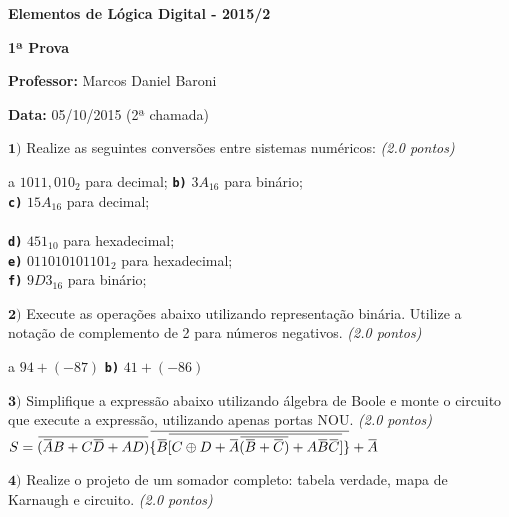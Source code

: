 \documentclass[12pt]{article}
\newcommand{\exerc}[3]{ \vspace*{25pt} {$\mathbf{#1)}$} #2 \hfill {\it #3} }
\newcommand{\exitem}[2]{ \texttt{\bf #1)} #2 \\ }
\newcommand*\xor{\mathbin{\oplus}}
\renewcommand{\neg}[1]{ 
  \mkern 1.5mu\overline{\mkern-1.5mu#1\mkern-1.5mu}\mkern 1.5mu
}
\newenvironment{exitems}[1]{
\\
\hspace*{30pt}
\begin{minipage}{0.8\textwidth}
\begin{multicols}{#1} 
}{
\end{multicols}
\end{minipage}
}
\begin{document}

\begin{center}
{\Large \bf Elementos de Lógica Digital - 2015/2}
\end{center}

{\large \bf 1ª Prova}

{\bf Professor:} Marcos Daniel Baroni

{\bf Data:} 05/10/2015 (2ª chamada)


\exerc{1}{Realize as seguintes conversões entre sistemas numéricos:}{(2.0 pontos)}
\begin{exitems}{2}
	\exitem{a}{ $1011,010_2$ para decimal;}
	\exitem{b}{ $3A_{16}$ para binário;}
	\exitem{c}{ $15A_{16}$ para decimal;}
	\\
	\exitem{d}{ $451_{10}$ para hexadecimal;}
	\exitem{e}{ $0110 1010 1101_{2}$ para hexadecimal;}
	\exitem{f}{ $9D3_{16}$ para binário;}
\end{exitems}

\exerc{2}{Execute as operações abaixo utilizando representação binária. Utilize a notação de complemento de 2 para números negativos.}{(2.0 pontos)}
\begin{exitems}{2}
	\exitem{a}{ $94 + (-87)$}
	\exitem{b}{ $41 + (-86)$}
\end{exitems}

\exerc{3}{Simplifique a expressão abaixo utilizando álgebra de Boole e monte o circuito que execute a expressão, utilizando apenas portas NOU.}{(2.0 pontos)}
$S = \neg{(\neg{A}B + C\neg{D} + AD)}\neg{\{\neg{B}\neg{[C\xor D + \neg{A}\neg{(\neg{B} + \neg{C})} + A\neg{B}\neg{C}]}\}}+\neg{A}$

\exerc{4}{Realize o projeto de um somador completo: tabela verdade, mapa de Karnaugh e circuito.}{(2.0 pontos)}
\end{document}
